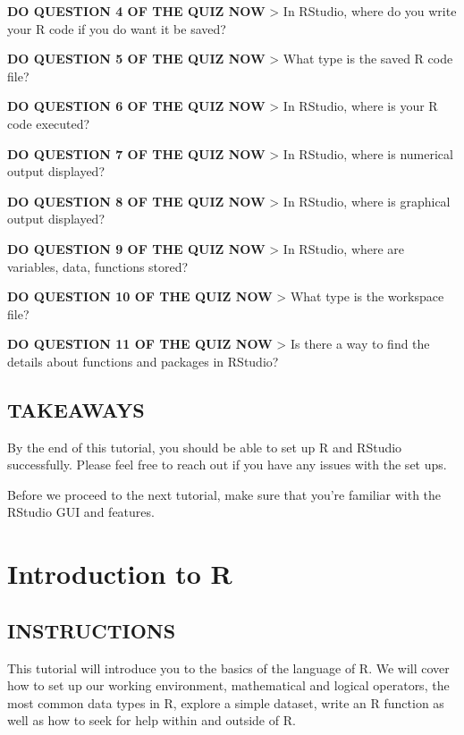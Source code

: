 \documentclass[
]{book}
\begin{document}
\textbf{DO QUESTION 4 OF THE QUIZ NOW}
\textgreater{} In RStudio, where do you write your R code if you do want it be saved?

\textbf{DO QUESTION 5 OF THE QUIZ NOW}
\textgreater{} What type is the saved R code file?

\textbf{DO QUESTION 6 OF THE QUIZ NOW}
\textgreater{} In RStudio, where is your R code executed?

\textbf{DO QUESTION 7 OF THE QUIZ NOW}
\textgreater{} In RStudio, where is numerical output displayed?

\textbf{DO QUESTION 8 OF THE QUIZ NOW}
\textgreater{} In RStudio, where is graphical output displayed?

\textbf{DO QUESTION 9 OF THE QUIZ NOW}
\textgreater{} In RStudio, where are variables, data, functions stored?

\textbf{DO QUESTION 10 OF THE QUIZ NOW}
\textgreater{} What type is the workspace file?

\textbf{DO QUESTION 11 OF THE QUIZ NOW}
\textgreater{} Is there a way to find the details about functions and packages in RStudio?

\hypertarget{takeaways}{%
\section{TAKEAWAYS}\label{takeaways}}

By the end of this tutorial, you should be able to set up R and RStudio successfully. Please feel free to reach out if you have any issues with the set ups.

Before we proceed to the next tutorial, make sure that you're familiar with the RStudio GUI and features.

\hypertarget{introduction-to-r}{%
\chapter{Introduction to R}\label{introduction-to-r}}

\hypertarget{instructions-1}{%
\section{INSTRUCTIONS}\label{instructions-1}}

This tutorial will introduce you to the basics of the language of R. We will cover how to set up our working environment, mathematical and logical operators, the most common data types in R, explore a simple dataset, write an R function as well as how to seek for help within and outside of R.
\end{document}
